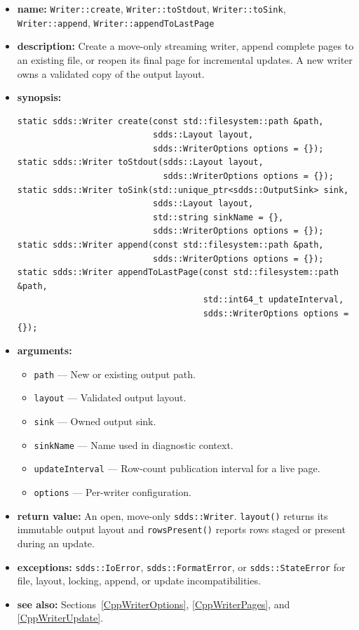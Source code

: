 \documentclass[11pt]{article}
\begin{document}
\begin{itemize}
\item {\bf name:}\newline
{\tt Writer::create}, {\tt Writer::toStdout}, {\tt Writer::toSink},
{\tt Writer::append}, {\tt Writer::appendToLastPage}
\item {\bf description:}\newline
Create a move-only streaming writer, append complete pages to an existing file,
or reopen its final page for incremental updates.  A new writer owns a validated
copy of the output layout.
\item {\bf synopsis:}
\begin{verbatim}
static sdds::Writer create(const std::filesystem::path &path,
                           sdds::Layout layout,
                           sdds::WriterOptions options = {});
static sdds::Writer toStdout(sdds::Layout layout,
                             sdds::WriterOptions options = {});
static sdds::Writer toSink(std::unique_ptr<sdds::OutputSink> sink,
                           sdds::Layout layout,
                           std::string sinkName = {},
                           sdds::WriterOptions options = {});
static sdds::Writer append(const std::filesystem::path &path,
                           sdds::WriterOptions options = {});
static sdds::Writer appendToLastPage(const std::filesystem::path &path,
                                     std::int64_t updateInterval,
                                     sdds::WriterOptions options = {});
\end{verbatim}
\item {\bf arguments:}
\begin{itemize}
\item {\tt path} --- New or existing output path.
\item {\tt layout} --- Validated output layout.
\item {\tt sink} --- Owned output sink.
\item {\tt sinkName} --- Name used in diagnostic context.
\item {\tt updateInterval} --- Row-count publication interval for a live page.
\item {\tt options} --- Per-writer configuration.
\end{itemize}
\item {\bf return value:}\newline
An open, move-only {\tt sdds::Writer}.  {\tt layout()} returns its immutable
output layout and {\tt rowsPresent()} reports rows staged or present during an
update.
\item {\bf exceptions:}\newline
{\tt sdds::IoError}, {\tt sdds::FormatError}, or {\tt sdds::StateError} for
file, layout, locking, append, or update incompatibilities.
\item {\bf see also:}\newline
Sections~\ref{CppWriterOptions}, \ref{CppWriterPages}, and
\ref{CppWriterUpdate}.
\end{itemize}
\end{document}
